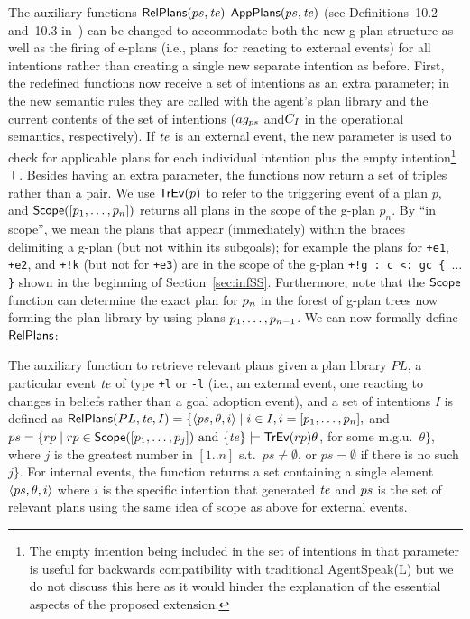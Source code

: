 The auxiliary functions $\mathsf{RelPlans}(ps,\mathit{te})$
$\mathsf{AppPlans}(ps,\mathit{te})$ (see Definitions~10.2 and~10.3
in~\cite{JasonBook}) can be changed to accommodate both the new g-plan
structure as well as the firing of e-plans (i.e., plans for reacting
to external events) for all intentions rather than creating a single
new separate intention as before. First, the redefined functions now
receive a set of intentions as an extra parameter; in the new semantic
rules they are called with the agent's plan library and the current
contents of the set of intentions ($ag_{ps}$ and$C_{I}$ in the
operational semantics, respectively). If $\mathit{te}$ is an external event,
the new parameter is used to check for applicable plans for each
individual intention plus the empty intention\footnote{The empty
  intention being included in the set of intentions in that parameter
  is useful for backwards compatibility with traditional AgentSpeak(L)
  but we do not discuss this here as it would hinder the explanation
  of the essential aspects of the proposed extension.}
$\top$. Besides having an extra parameter, the functions now return a
set of triples rather than a pair. We use $\mathsf{TrEv}(p)$ to refer to the
triggering event of a plan $p$, and $\mathsf{Scope}([p_1,\ldots,p_n])$
returns all plans in the scope of the g-plan $p_n$. By ``in scope'',
we mean the plans that appear (immediately) within the braces
delimiting a g-plan (but not within its subgoals); for example the
plans for \texttt{+e1}, \texttt{+e2}, and \texttt{+!k} (but not for
\texttt{+e3}) are in the scope of the g-plan \texttt{+!g : c <: gc \{
  $\ldots$ \}} shown in the beginning of
Section~\ref{sec:infSS}. Furthermore, note that the $\mathsf{Scope}$ function
can determine the exact plan for $p_n$ in the forest of g-plan trees
now forming the plan library by using plans
$p_1,\ldots,p_{n-1}$. We can now formally define $\mathsf{RelPlans}$:

\begin{definition}
  The auxiliary function to retrieve relevant plans given a plan
  library $PL$, a particular event $\mathit{te}$ of type \texttt{+l} or
  \texttt{-l} (i.e., an external event, one reacting to changes in
  beliefs rather than a goal adoption event), and a set of intentions
  $I$ is defined as
  $\mathsf{RelPlans}(PL,\mathit{te},I) = \{ \langle ps,\theta,i\rangle \mid i \in
  I, i = [p_1,\ldots,p_n],$
  and
  $ps = \{ rp \mid rp \in \mathsf{Scope}([p_1,\ldots,p_j]) \mbox{ and }
  \{\mathit{te}\} \models \mathsf{TrEv}(rp)\theta$,
  for some m.g.u.\ $\theta\}$, where $j$ is the greatest number in
  $[1..n]$ s.t.\ $ps \neq \emptyset$, or $ps=\emptyset$ if there is no
  such $j\}$. For internal events, the function returns a set
  containing a single element $\langle ps,\theta,i\rangle$ where
  $i$ is the specific intention that generated $\mathit{te}$ and $ps$ is
  the set of relevant plans using the same idea of scope as above for
  external events.
\end{definition}

